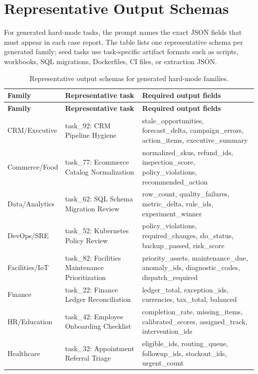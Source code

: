 \documentclass[11pt]{article}
\begin{document}
\section{Representative Output Schemas}
\label{app:output-schemas}
For generated hard-mode tasks, the prompt names the exact JSON fields that must appear in each case report. The table lists one representative schema per generated family; seed tasks use task-specific artifact formats such as scripts, workbooks, SQL migrations, Dockerfiles, CI files, or extraction JSON.
\begingroup
\small
\setlength{\tabcolsep}{4pt}
\renewcommand{\arraystretch}{1.08}
\begin{longtable}{L{0.20\textwidth}L{0.23\textwidth}L{0.47\textwidth}}
\caption{Representative output schemas for generated hard-mode families.}\label{tab:representative-output-schemas}\\
\toprule
\textbf{Family} & \textbf{Representative task} & \textbf{Required output fields} \\
\midrule
\endfirsthead
\toprule
\textbf{Family} & \textbf{Representative task} & \textbf{Required output fields} \\
\midrule
\endhead
CRM/Executive & task\_92: CRM Pipeline Hygiene & stale\_opportunities, forecast\_delta, campaign\_errors, action\_items, executive\_summary \\
Commerce/Food & task\_77: Ecommerce Catalog Normalization & normalized\_skus, refund\_ids, inspection\_score, policy\_violations, recommended\_action \\
Data/Analytics & task\_62: SQL Schema Migration Review & row\_count, quality\_failures, metric\_delta, rule\_ids, experiment\_winner \\
DevOps/SRE & task\_52: Kubernetes Policy Review & policy\_violations, required\_changes, slo\_status, backup\_passed, risk\_score \\
Facilities/IoT & task\_82: Facilities Maintenance Prioritization & priority\_assets, maintenance\_due, anomaly\_ids, diagnostic\_codes, dispatch\_required \\
Finance & task\_22: Finance Ledger Reconciliation & ledger\_total, exception\_ids, currencies, tax\_total, balanced \\
HR/Education & task\_42: Employee Onboarding Checklist & completion\_rate, missing\_items, calibrated\_scores, assigned\_track, intervention\_ids \\
Healthcare & task\_32: Appointment Referral Triage & eligible\_ids, routing\_queue, followup\_ids, stockout\_ids, urgent\_count \\

\end{longtable}
\end{document}
